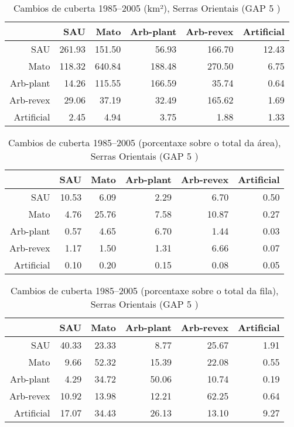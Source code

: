 \clearpage
\begin{table}[p]
\centering
\caption{Cambios de cuberta 1985--2005 (km²), Serras Orientais (GAP 5 )} 
\label{TaboaContinxGAP5}
\begin{tabular}{rrrrrr}
  \hline
 & SAU & Mato & Arb-plant & Arb-revex & Artificial \\ 
  \hline
SAU & 261.93 & 151.50 & 56.93 & 166.70 & 12.43 \\ 
  Mato & 118.32 & 640.84 & 188.48 & 270.50 & 6.75 \\ 
  Arb-plant & 14.26 & 115.55 & 166.59 & 35.74 & 0.64 \\ 
  Arb-revex & 29.06 & 37.19 & 32.49 & 165.62 & 1.69 \\ 
  Artificial & 2.45 & 4.94 & 3.75 & 1.88 & 1.33 \\ 
   \hline
\end{tabular}
\end{table}
\begin{table}[p]
\centering
\caption{Cambios de cuberta 1985--2005 (porcentaxe sobre o total da área), Serras Orientais (GAP 5 )} 
\label{TaboaContinxPTGAP5}
\begin{tabular}{rrrrrr}
  \hline
 & SAU & Mato & Arb-plant & Arb-revex & Artificial \\ 
  \hline
SAU & 10.53 & 6.09 & 2.29 & 6.70 & 0.50 \\ 
  Mato & 4.76 & 25.76 & 7.58 & 10.87 & 0.27 \\ 
  Arb-plant & 0.57 & 4.65 & 6.70 & 1.44 & 0.03 \\ 
  Arb-revex & 1.17 & 1.50 & 1.31 & 6.66 & 0.07 \\ 
  Artificial & 0.10 & 0.20 & 0.15 & 0.08 & 0.05 \\ 
   \hline
\end{tabular}
\end{table}
\begin{table}[p]
\centering
\caption{Cambios de cuberta 1985--2005 (porcentaxe sobre o total da fila), Serras Orientais (GAP 5 )} 
\label{TaboaContinxPFGAP5}
\begin{tabular}{rrrrrr}
  \hline
 & SAU & Mato & Arb-plant & Arb-revex & Artificial \\ 
  \hline
SAU & 40.33 & 23.33 & 8.77 & 25.67 & 1.91 \\ 
  Mato & 9.66 & 52.32 & 15.39 & 22.08 & 0.55 \\ 
  Arb-plant & 4.29 & 34.72 & 50.06 & 10.74 & 0.19 \\ 
  Arb-revex & 10.92 & 13.98 & 12.21 & 62.25 & 0.64 \\ 
  Artificial & 17.07 & 34.43 & 26.13 & 13.10 & 9.27 \\ 
   \hline
\end{tabular}
\end{table}
